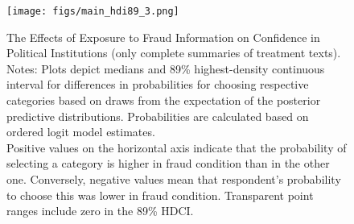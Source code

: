 \documentclass[11pt, ngerman,english,a4]{article}
\begin{document}
\begin{figure}[H]
	\centering
	\texttt{[image: figs/main\_hdi89\_3.png]}
	\caption{The Effects of Exposure to Fraud Information on Confidence in Political Institutions (only complete summaries of treatment texts).  \\
		\footnotesize{Notes: Plots depict medians and 89\% highest-density continuous interval for differences in probabilities for choosing respective categories based on draws from the expectation of the posterior predictive distributions. Probabilities are calculated based on ordered logit model estimates.\\
			Positive values on the horizontal axis indicate that the probability of selecting a category is higher in fraud condition than in the other one. Conversely, negative values mean that respondent's probability to choose this was lower in fraud condition. 
Transparent point ranges include zero in the 89\% HDCI.\\
	} }
	\singlespacing
	\raggedright
	    
	\label{fig:main-3}
\end{figure}
\end{document}
